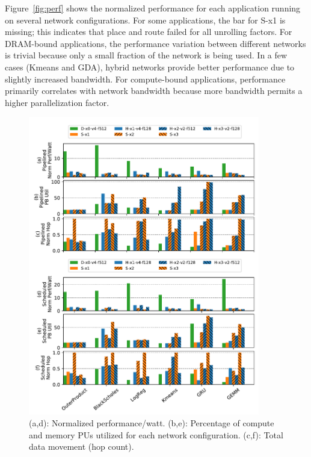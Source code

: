 Figure~\ref{fig:perf} shows the normalized performance for each application running on several network configurations.
For some applications, the bar for S-x1 is missing; this indicates that place and route failed for all unrolling factors.
For DRAM-bound applications, the performance variation between different networks is trivial because only a small fraction of the network is being used. 
In a few cases (Kmeans and GDA), hybrid networks  provide better performance due to slightly increased bandwidth.
For compute-bound applications, performance primarily correlates with network bandwidth because more bandwidth permits a higher parallelization factor. 

\begin{figure}
\centering
  \includegraphics[width=0.9\textwidth]{network/figs/energy.pdf} 
\caption{(a,d): Normalized performance/watt. (b,e): Percentage of compute and memory PUs utilized for each network configuration. 
  (c,f): Total data movement (hop count).}
\label{fig:energy}
\end{figure}

